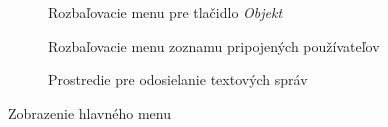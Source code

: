 \begin{figure}[H]
	\quad
	\begin{subfigure}[t]{0.48\linewidth}	
		\caption{Rozbaľovacie menu pre tlačidlo \textit{Objekt} }
		\label{obr:menu-object}
	\end{subfigure}
	\quad
	\begin{subfigure}[t]{0.48\linewidth}	
		\caption{Rozbaľovacie menu zoznamu pripojených používateľov  }
		\label{obr:menu-users}
	\end{subfigure}
	\quad
	\begin{subfigure}[t]{0.6\linewidth}	
		\caption{Prostredie pre odosielanie textových správ}
		\label{obr:menu-messenger}
	\end{subfigure}
	\caption{Zobrazenie hlavného menu}
\end{figure}


